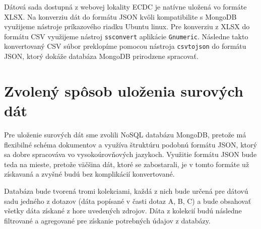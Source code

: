 \documentclass[11pt, a4paper]{article}
\begin{document}
\hfill \break
Dátová sada dostupná z webovej lokality ECDC je natívne uložená vo formáte XLSX. Na konverziu dát do formátu JSON kvôli kompatibilite s MongoDB využijeme nástroje príkazového riadku Ubuntu linux. Pre konverziu z XLSX do formátu CSV využijeme nástroj \texttt{ssconvert} aplikácie \texttt{Gnumeric}. Následne takto konvertovaný CSV súbor preklopíme pomocou nástroja \texttt{csvtojson} do formátu JSON, ktorý dokáže databáza MongoDB prirodzene spracovať.

\section*{Zvolený spôsob uloženia surových dát}
Pre uloženie surových dát sme zvolili NoSQL databázu MongoDB, pretože má flexibilné schéma dokumentov a využíva štruktúru podobnú formátu JSON, ktorý sa dobre spracováva vo vysokoúrovňových jazykoch. Využitie formátu JSON bude teda na mieste, pretože väčšina dát, ktoré se zabostarali, je v tomto formáte už získavaná a zvyšné budú bez komplikácií konvertované.

\hfill \break
Databáza bude tvorená tromi kolekciami, každá z nich bude určená pre dátovú sadu jedného z dotazov (dáta popísané v časti dotaz A, B, C) a bude obsahovať všetky dáta získané z hore uvedených zdrojov. Dáta z kolekcií budú následne filtrované a agregované pre získanie potrebných údajov z databázy.
\end{document}

